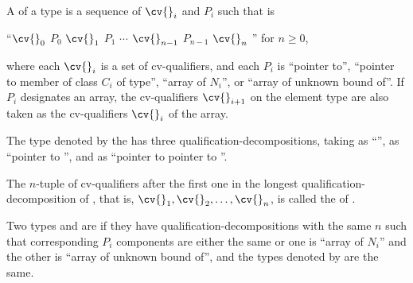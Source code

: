 %
\pnum
A  of a type 
is a sequence of
$\cv{}_i$ and $P_i$
such that  is
\begin{indented}
``$\cv{}_0$ $P_0$ $\cv{}_1$ $P_1$ $\cdots$ $\cv{}_{n-1}$ $P_{n-1}$ $\cv{}_n$ '' for $n \geq 0$,
\end{indented}
where
each $\cv{}_i$ is a set of cv-qualifiers, and
each $P_i$ is
``pointer to'',
``pointer to member of class $C_i$ of type'',
``array of $N_i$'', or
``array of unknown bound of''.
If $P_i$ designates an array,
the cv-qualifiers $\cv{}_{i+1}$ on the element type are also taken as
the cv-qualifiers $\cv{}_i$ of the array.
\begin{example}
The type denoted by the  
has three qualification-decompositions,
taking 
as ``'',
as ``pointer to '', and
as ``pointer to pointer to ''.
\end{example}
The $n$-tuple of cv-qualifiers after the first one
in the longest qualification-decomposition of , that is,
$\cv{}_1, \cv{}_2, \dotsc, \cv{}_n$, is called the
 of .

\pnum
{}%
Two types  and  are  if
they have qualification-decompositions with the same $n$
such that corresponding $P_i$ components are either the same
or one is ``array of $N_i$'' and the other is ``array of unknown bound of'',
and the types denoted by  are the same.

